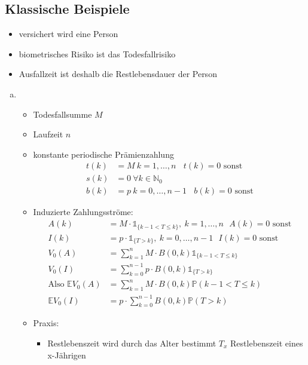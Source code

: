 \subsection{Klassische Beispiele}
\label{sub:klassische_beispiele}
\begin{itemize}
	\item versichert wird eine Person
	\item biometrisches Risiko ist das Todesfallrisiko
	\item Ausfallzeit ist deshalb die Restlebensdauer der Person
\end{itemize}
\begin{enumerate}[(a)]
	\item {}
	\begin{itemize}
		\item Todesfallsumme $M$
		\item Laufzeit $n$
		\item konstante periodische Prämienzahlung
		\begin{equation*}
		\begin{aligned}
			t(k) &= M ~ k=1,\dots,n~~~~t(k)=0 \text{ sonst}\\
			s(k) &= 0 ~ \forall k \in \mathds{N}_0\\
			b(k) &= p ~k=0,\dots,n-1~~~~b(k)=0 \text{ sonst}
		\end{aligned}
		\end{equation*}
		\item Induzierte Zahlungsströme:
		\begin{equation*}
		\begin{aligned}
			A(k) &= M\cdot \mathbb{1}_{\{k-1<T\le k\}},~k=1,\dots,n~~~A(k)=0 \text{ sonst}\\
			I(k) &= p\cdot \mathbb{1}_{\{T>k\}},~k=0,\dots,n-1~~~I(k)=0 \text{ sonst}\\
			V_0(A) &= \sum_{k=1}^{n}M\cdot B(0,k) \mathbb{1}_{\{k-1<T\le k \}}\\
			V_0(I) &= \sum_{k=0}^{n-1} p\cdot B(0,k) \mathbb{1}_{\{T>k \}}\\
			\text{Also } \mathds{E}V_0(A) &= \sum_{k=1}^{n}M\cdot B(0,k) \mathds{P}(k-1<T\le k)\\
			\mathds{E}V_0(I) &= p\cdot \sum_{k=0}^{n-1}B(0,k) \mathds{P}(T>k)
		\end{aligned}
		\end{equation*}
		\item Praxis:
		\begin{itemize}
			\item Restlebenszeit wird durch das Alter bestimmt $T_x$ Restlebenszeit eines x-Jährigen

\end{itemize}
\end{itemize}
\end{enumerate}
